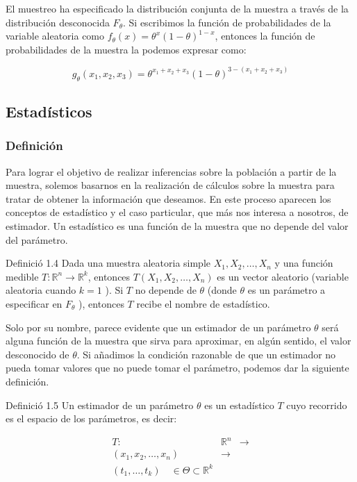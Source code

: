 \documentclass[
]{article}
\begin{document}
El muestreo ha especificado la distribución conjunta de la muestra a través de la distribución desconocida \(F_{\theta}\). Si escribimos la función de probabilidades de la variable aleatoria como \(f_{\theta}(x)=\theta^{x}(1-\theta)^{1-x}\), entonces la función de probabilidades de la muestra la podemos expresar como:

\[
g_{\theta}\left(x_{1}, x_{2}, x_{3}\right)=\theta^{x_{1}+x_{2}+x_{3}}(1-\theta)^{3-\left(x_{1}+x_{2}+x_{3}\right)}
\]

\subsection{Estadísticos}\label{estaduxedsticos}

\subsubsection{Definición}\label{definiciuxf3n-1}

Para lograr el objetivo de realizar inferencias sobre la población a partir de la muestra, solemos basarnos en la realización de cálculos sobre la muestra para tratar de obtener la información que deseamos. En este proceso aparecen los conceptos de estadístico y el caso particular, que más nos interesa a nosotros, de estimador. Un estadístico es una función de la muestra que no depende del valor del parámetro.

Definició 1.4 Dada una muestra aleatoria simple \(X_{1}, X_{2}, \ldots, X_{n}\) y una función medible \(T: \mathbb{R}^{n} \longrightarrow \mathbb{R}^{k}\), entonces \(T\left(X_{1}, X_{2}, \ldots, X_{n}\right)\) es un vector aleatorio (variable aleatoria cuando \(k=1\) ). Si \(T\) no depende de \(\theta\) (donde \(\theta\) es un parámetro a especificar en \(F_{\theta}\) ), entonces \(T\) recibe el nombre de estadístico.

Solo por su nombre, parece evidente que un estimador de un parámetro \(\theta\) será alguna función de la muestra que sirva para aproximar, en algún sentido, el valor desconocido de \(\theta\). Si añadimos la condición razonable de que un estimador no pueda tomar valores que no puede tomar el parámetro, podemos dar la siguiente definición.

Definició 1.5 Un estimador de un parámetro \(\theta\) es un estadístico \(T\) cuyo recorrido es el espacio de los parámetros, es decir:

\[
\begin{array}{ccc}
T: & \mathbb{R}^{n} & \longrightarrow \\
\left(x_{1}, x_{2}, \ldots, x_{n}\right) & \longrightarrow \\
\left(t_{1}, \ldots, t_{k}\right) \quad \in \Theta \subset \mathbb{R}^{k}
\end{array}
\]
\end{document}
